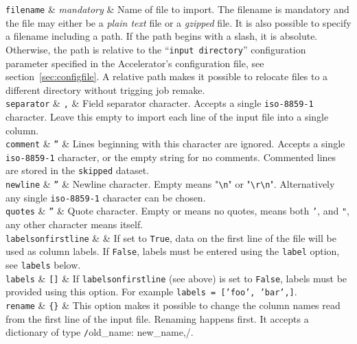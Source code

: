 \RP \texttt{filename} & \emph{mandatory} & Name of file to import.
The filename is mandatory and the file may either be a \textsl{plain
  text} file or a \textsl{gzipped} file.  It is also possible to
specify a filename including a path.  If the path begins with a slash,
it is absolute.  Otherwise, the path is relative to the
``\texttt{input directory}'' configuration parameter specified in the
Accelerator's configuration file, see section~\ref{sec:configfile}.  A
relative path makes it possible to relocate files to a different
directory without trigging job remake.\\

\RP \texttt{separator} & \texttt{,} & Field separator character.
Accepts a single \texttt{iso-8859-1} character.  Leave this empty to
import each line of the input file into a single column.  \\

\RP \texttt{comment} & \texttt{''} & Lines beginning with this
character are ignored.  Accepts a single \texttt{iso-8859-1}
character, or the empty string for no comments. Commented lines are
stored in the \texttt{skipped} dataset.\\

\RP \texttt{newline} & \texttt{''} & Newline character.  Empty means
"\texttt{\textbackslash{}n}" or "\texttt{\textbackslash{}r\textbackslash{}n}".
Alternatively any single \texttt{iso-8859-1} character can be chosen.\\

\RP \texttt{quotes} & \texttt{''} & Quote character.  Empty or \pyFalse means no
quotes, \pyTrue means both \texttt{'}, and \texttt{"}, any other
character means itself. \\

\RP \texttt{labelsonfirstline} & \pyTrue & If set to
\texttt{True}, data on the first line of the file will
be used as column labels.  If \texttt{False}, labels must
be entered using the \texttt{label} option, see \texttt{labels}
below.\\

\RP \texttt{labels} & \texttt{[]} & If \texttt{labelsonfirstline} (see
above) is set to \texttt{False}, labels must be provided
using this option.  For example \texttt{labels = ['foo',
'bar',]}.\\

\RP \texttt{rename} & \texttt{\{\}} & This option makes it possible to
change the column names read from the first line of the input file.
Renaming happens first.  It accepts a dictionary of type
\texttt/{old_name: new_name,}/.\\

